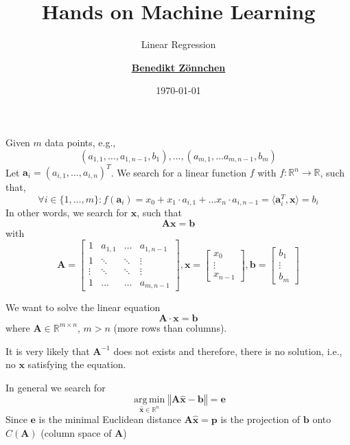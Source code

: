 \documentclass[aspectratio=169]{beamer}
\title{Hands on Machine Learning}
\subtitle{Linear Regression}
\author{\href{mailto:zoennchen.benedikt@hm.edu}{\textbf{Benedikt Z\"onnchen}}}
\date{\today}
\newcommand{\A}{\mathbf{A}}
\newcommand{\xx}{\mathbf{x}}
\newcommand{\bb}{\mathbf{b}}
\newcommand{\ee}{\mathbf{e}}
\newcommand{\pp}{\mathbf{p}}
\newcommand\inner[2]{\langle #1, #2 \rangle }
\newcommand{\R}{\mathbb{R}}
\DeclareMathOperator*{\argmin}{arg\,min}
\begin{document}
	
	\begin{frame}
		\titlepage
	\end{frame}

	\begin{frame}
		Given $m$ data points, e.g., 
		\begin{equation*}
			(a_{1,1}, \ldots, a_{1,n-1}, b_1), \ldots, (a_{m,1}, \ldots a_{m,n-1}, b_m)
		\end{equation*}
		Let $\mathbf{a}_i = (a_{i,1}, \ldots, a_{i,n})^T$.
		We search for a linear function $f$ with $f : \mathbb{R}^n \rightarrow \mathbb{R}$, such that,
		\begin{equation*}
			\forall i \in \{1,\ldots, m\}: f(\mathbf{a}_i) = x_0 + x_1 \cdot a_{i,1} + \ldots x_n \cdot a_{i,n-1} = \inner{\mathbf{a}_i^T}{\xx} = b_i
		\end{equation*}
		In other words, we search for $\xx$, such that
		\begin{equation*}
			\A \xx = \bb
		\end{equation*}
		with 
		\begin{equation*}
			\A = \begin{bmatrix}
				1 & a_{1,1} & \ldots & a_{1, n-1} \\
				1 & \ddots & \ddots & \vdots \\
				\vdots & \ddots & \ddots & \vdots \\
				1 & \ldots & \ldots & a_{m,n-1} 
			\end{bmatrix}, \xx = \begin{bmatrix} x_0 \\ \vdots \\ x_{n-1} \end{bmatrix}, \bb = \begin{bmatrix} b_1 \\ \vdots \\ b_{m} \end{bmatrix}
		\end{equation*}
	\end{frame}

	\begin{frame}
		We want to solve the linear equation
		\begin{equation}
			\A \cdot \xx = \bb
		\end{equation}
		where $\A \in \mathbb{R}^{m \times n}$, $m > n$ (more rows than columns).
		\begin{flushleft}
			It is very likely that $\A^{-1}$ does not exists and therefore, there is no solution, i.e., no $\xx$ satisfying the equation.
		\end{flushleft}
		In general we search for
		\begin{equation}
			\argmin\limits_{\hat{\xx} \in \R^n} \left\Vert  \A\hat{\xx} - \bb \right\Vert = \ee
		\end{equation}
		Since $\ee$ is the minimal Euclidean distance $\A\hat{\xx} = \pp$ is the projection of $\bb$ onto $C(\A)$ (column space of $\A$)
	\end{frame}
\end{document}
